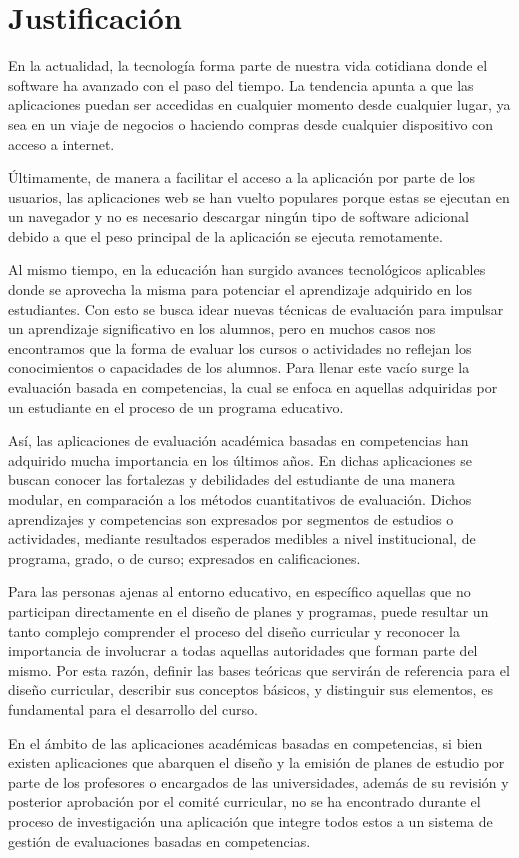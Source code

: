 \section{Justificación}
En la actualidad, la tecnología forma parte de nuestra vida cotidiana donde el software ha avanzado con el paso del tiempo. La tendencia apunta a que las aplicaciones puedan ser accedidas en cualquier momento desde cualquier lugar, ya sea en un viaje de negocios o haciendo compras desde cualquier dispositivo con acceso a internet. 

Últimamente, de manera a facilitar el acceso a la aplicación por parte de los usuarios, las aplicaciones web se han vuelto populares porque estas se ejecutan en un navegador y no es necesario descargar ningún tipo de software adicional debido a que el peso principal de la aplicación se ejecuta remotamente\citep{net_app_architecture}.

Al mismo tiempo, en la educación han surgido avances tecnológicos aplicables donde se aprovecha la misma para potenciar el aprendizaje adquirido en los estudiantes. Con esto se busca idear nuevas técnicas de evaluación para impulsar un aprendizaje significativo en los alumnos, pero en muchos casos nos encontramos que la forma de evaluar los cursos o actividades no reflejan los conocimientos o capacidades de los alumnos. Para llenar este vacío surge la evaluación basada en competencias, la cual se enfoca en aquellas adquiridas por un estudiante en el proceso de un programa educativo\citep{kuh_knowing_2014}.  

Así, las aplicaciones de evaluación académica basadas en competencias han adquirido mucha importancia en los últimos años\citep{kuh_knowing_2014}. En dichas aplicaciones se buscan conocer las fortalezas y debilidades del estudiante de una manera modular, en comparación a los métodos cuantitativos de evaluación. Dichos aprendizajes y competencias son expresados por segmentos de estudios o actividades, mediante resultados esperados medibles a nivel institucional, de programa, grado, o de curso; expresados en calificaciones\citep{kuh_using_2015}.

Para las personas ajenas al entorno educativo, en específico aquellas que no participan directamente en el diseño de planes y programas, puede resultar un tanto complejo comprender el proceso del diseño curricular y reconocer la importancia de involucrar a todas aquellas autoridades que forman parte del mismo. Por esta razón, definir las bases teóricas que servirán de referencia para el diseño curricular, describir sus conceptos básicos, y distinguir sus elementos, es fundamental para el desarrollo del curso\citep{boyle_curriculum_2016}.

En el ámbito de las aplicaciones académicas basadas en competencias, si bien existen aplicaciones que abarquen el diseño y la emisión de planes de estudio por parte de los profesores o encargados de las universidades, además de su revisión y posterior aprobación por el comité curricular, no se ha encontrado durante el proceso de investigación una aplicación que integre todos estos a un sistema de gestión de evaluaciones basadas en competencias.